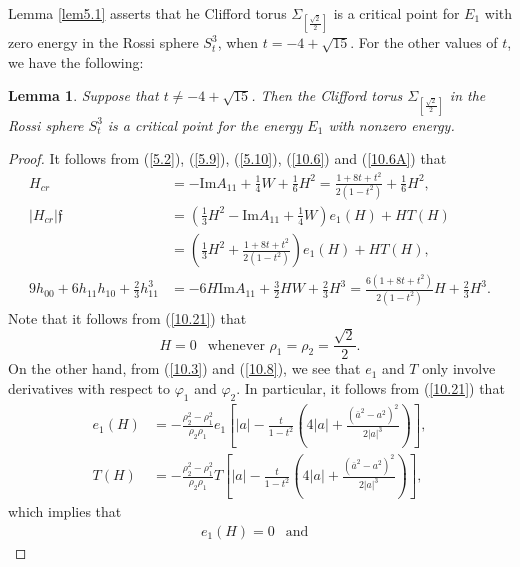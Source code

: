 \documentclass{amsart}
\newtheorem{lem}[theorem]{Lemma}
\theoremstyle{Corollary}
\numberwithin{equation}{section}
\begin{document}
Lemma \ref{lem5.1} asserts that he Clifford torus
 $\Sigma_{[\frac{\sqrt{2}}{2}]}$  is a critical point for $E_1$ 
 with zero energy
 in the Rossi sphere $S^3_{t}$, when $t=-4+\sqrt{15}$. 
 For the other values of $t$, we have the following: 

\begin{lem}\label{lem5.2}
Suppose that $t\neq -4+\sqrt{15}$. 
Then the Clifford torus
 $\Sigma_{[\frac{\sqrt{2}}{2}]}$ 
in the Rossi sphere $S^3_{t}$
is a critical point for the energy $E_1$ with nonzero energy.
\end{lem}
\begin{proof}
It follows from  (\ref{5.2}), (\ref{5.9}),
(\ref{5.10}), (\ref{10.6}) and (\ref{10.6A})
that 
\begin{equation}\label{10.28}
\begin{split}
H_{cr}&=-\mbox{Im} A_{11}+\frac{1}{4}W+\frac{1}{6}H^2=\frac{1+8t+t^2}{2(1-t^2)}+\frac{1}{6}H^2,\\
|H_{cr}|\mathfrak{f}&=\left(\frac{1}{3}H^2-\mbox{Im} A_{11}+\frac{1}{4}W\right)e_1(H)+HT(H)\\
&=\left(\frac{1}{3}H^2+\frac{1+8t+t^2}{2(1-t^2)}\right)e_1(H)+HT(H),\\
9h_{00}+6h_{11}h_{10}+\frac{2}{3}h_{11}^3&=-6H\mbox{Im} A_{11}+\frac{3}{2}HW+\frac{2}{3}H^3
=\frac{6(1+8t+t^2)}{2(1-t^2)}H+\frac{2}{3}H^3.
\end{split}
\end{equation}
Note that it follows from (\ref{10.21}) that 
\begin{equation}\label{10.31}
H=0~~\mbox{ whenever }\rho_1=\rho_2=\frac{\sqrt{2}}{2}.
\end{equation}
On the other hand, from (\ref{10.3}) and (\ref{10.8}), 
we see that $e_1$ and $T$ only involve derivatives
with respect to $\varphi_1$ and $\varphi_2$. 
In particular, it follows from (\ref{10.21}) that 
\begin{equation*}
\begin{split}
e_1(H)&=-\frac{\rho_2^2-\rho_1^2}{\rho_2\rho_1}e_1\left[|a|-\frac{t}{1-t^2}\left(4|a|+\frac{(\overline{a}^2-a^2)^2}{2|a|^3}\right)\right],\\
T(H)&=-\frac{\rho_2^2-\rho_1^2}{\rho_2\rho_1}T\left[|a|-\frac{t}{1-t^2}\left(4|a|+\frac{(\overline{a}^2-a^2)^2}{2|a|^3}\right)\right],
\end{split}
\end{equation*}
which implies that 
\begin{equation}\label{10.30}
\begin{split}
e_1(H)=0~~\mbox{ and }~~

\end{split}
\end{equation}
\end{proof}
\end{document}
